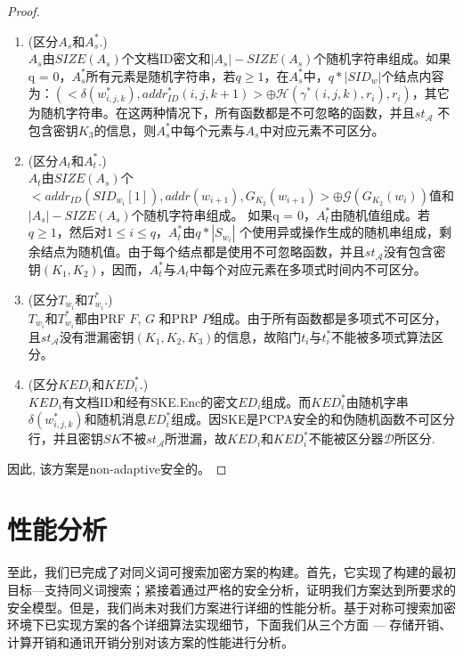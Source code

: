 \begin{thm}
\begin{proof}
\begin{enumerate}
  \item (区分$A_s$和$A_s^*$.) \\
   $A_s$由$SIZE(A_s)$个文档ID密文和$|A_s| - SIZE(A_s)$个随机字符串组成。如果q = 0，$A_s^*$所有元素是随机字符串，若$q \geq 1$，在$A_s^*$中，$q*|SID_w|$个结点内容为：$(<\delta(w_{i,j,k}^*), addr_{ID}^*(i, j, k+1)> \oplus \mathcal{H}(\gamma^*(i,j,k), r_i), r_i)$，其它为随机字符串。在这两种情况下，所有函数都是不可忽略的函数，并且$st_{\mathcal{A}}$ 不包含密钥$K_3$的信息，则$A_s^*$中每个元素与$A_s$中对应元素不可区分。

  \item (区分$A_t$和$A_t^*$.) \\
  $A_t$由$SIZE(A_s)$个$<addr_{ID}(SID_{w_i}[1]),addr(w_{i+1}),G_{K_2}(w_{i+1})> \oplus \mathcal{G}(G_{K_2}(w_i))$值和$|A_s| - SIZE(A_s)$个随机字符串组成。
  如果q = 0，$A_t^*$由随机值组成。若$q \geq 1$，然后对$1 \leq i \leq q$，$A_t^*$由$q*|S_{w_i}|$ 个使用异或操作生成的随机串组成，剩余结点为随机值。由于每个结点都是使用不可忽略函数，并且$st_{\mathcal{A}}$没有包含密钥$(K_1, K_2)$，因而，$A_t^*$与$A_t$中每个对应元素在多项式时间内不可区分。

  \item (区分$T_{w_i}$和$T_{w_i}^*$.) \\
  $T_{w_i}$和$T_{w_i}^*$都由PRF $F$, $G$ 和PRP $P$组成。由于所有函数都是多项式不可区分，且$st_{\mathcal{A}}$没有泄漏密钥$(K_1, K_2, K_3)$的信息，故陷门$t_i$与$t_i^*$不能被多项式算法区分。

  \item (区分$KED_i$和$KED_i^*$.) \\
  $KED_i$有文档ID和经有SKE.Enc的密文$ED_i$组成。而$KED_i^*$由随机字串$\delta(w_{i,j,k}^*)$和随机消息$ED_i^*$组成。因SKE是PCPA安全的和伪随机函数不可区分行，并且密钥$SK$不被$st_{\mathcal{A}}$所泄漏，故$KED_i$和$KED_i^*$不能被区分器$\mathcal{D}$所区分.

\end{enumerate}

因此, 该方案是non-adaptive安全的。
\end{proof}
\end{thm}

\section{性能分析}
\label{sec:synonym_capability_analysis}
至此，我们已完成了对同义词可搜索加密方案的构建。首先，它实现了构建的最初目标---支持同义词搜索；紧接着通过严格的安全分析，证明我们方案达到所要求的安全模型。但是，我们尚未对我们方案进行详细的性能分析。基于对称可搜索加密环境下已实现方案的各个详细算法实现细节，下面我们从三个方面 --- 存储开销、计算开销和通讯开销分别对该方案的性能进行分析。


